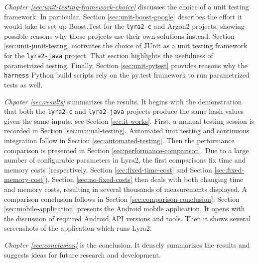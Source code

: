 \emph{Chapter \ref{sec:unit-testing-framework-choice}} discusses the choice of a unit testing framework. In particular, Section \ref{sec:unit-boost-google} describes the effort it would take to set up Boost.Test for the \texttt{lyra2-c} and Argon2 projects, showing possible reasons why those projects use their own solutions instead. Section \ref{sec:unit-junit-testng} motivates the choice of JUnit as a unit testing framework for the \texttt{lyra2-java} project. That section highlights the usefulness of parametrized testing. Finally, Section \ref{sec:unit-pytest} provides reasons why the \texttt{harness} Python build scripts rely on the py.test framework to run parametrized tests as well.

\emph{Chpater \ref{sec:results}} summarizes the results. It begins with the demonstration that both the \texttt{lyra2-c} and \texttt{lyra2-java} projects produce the same hash values given the same inputs, see Section \ref{sec:it-works}. First, a manual testing session is recorded in Section \ref{sec:manual-testing}. Automated unit testing and continuous integration follow in Section \ref{sec:automated-testing}. Then the performance comparison is presented in Section \ref{sec:performance-comparison}. Due to a large number of configurable parameters in Lyra2, the first comparisons fix time and memory costs (respectively, Section \ref{sec:fixed-time-cost} and Section \ref{sec:fixed-memory-cost}). Section \ref{sec:no-fixed-costs} then deals with both changing time and memory costs, resulting in several thousands of measurements displayed. A comparison conclusion follows in Section \ref{sec:comparison-conclusion}. Section \ref{sec:mobile-application} presents the Android mobile application. It opens with the discussion of required Android API versions and tools. Then it shows several screenshots of the application which runs Lyra2.

\emph{Chapter \ref{sec:conclusion}} is the conclusion. It densely summarizes the results and suggests ideas for future research and development.
